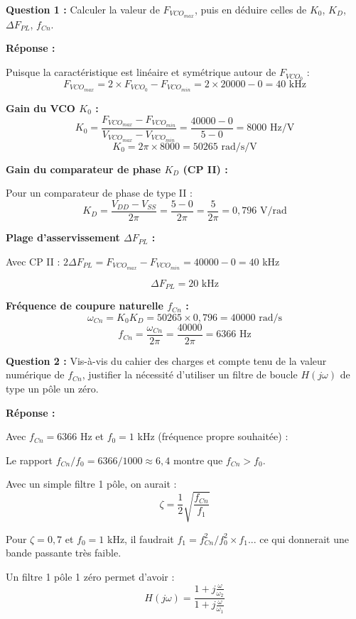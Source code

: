\documentclass[a4paper,11pt]{article}
\begin{document}
\textbf{Question 1 :} Calculer la valeur de $F_{VCO_{max}}$, puis en déduire celles de $K_0$, $K_D$, $\Delta F_{PL}$, $f_{Cn}$.

\vspace{0.3cm}
\textbf{Réponse :}

Puisque la caractéristique est linéaire et symétrique autour de $F_{VCO_0}$ :
\[
F_{VCO_{max}} = 2 \times F_{VCO_0} - F_{VCO_{min}} = 2 \times 20000 - 0 = \boxed{40 \text{ kHz}}
\]

\textbf{Gain du VCO $K_0$ :}
\[
K_0 = \frac{F_{VCO_{max}} - F_{VCO_{min}}}{V_{VCO_{max}} - V_{VCO_{min}}} = \frac{40000 - 0}{5 - 0} = 8000 \text{ Hz/V}
\]
\[
K_0 = 2\pi \times 8000 = \boxed{50265 \text{ rad/s/V}}
\]

\textbf{Gain du comparateur de phase $K_D$ (CP II) :}

Pour un comparateur de phase de type II :
\[
K_D = \frac{V_{DD} - V_{SS}}{2\pi} = \frac{5 - 0}{2\pi} = \frac{5}{2\pi} = \boxed{0{,}796 \text{ V/rad}}
\]

\textbf{Plage d'asservissement $\Delta F_{PL}$ :}

Avec CP II : $2\Delta F_{PL} = F_{VCO_{max}} - F_{VCO_{min}} = 40000 - 0 = 40$ kHz

\[
\boxed{\Delta F_{PL} = 20 \text{ kHz}}
\]

\textbf{Fréquence de coupure naturelle $f_{Cn}$ :}
\[
\omega_{Cn} = K_0 K_D = 50265 \times 0{,}796 = 40000 \text{ rad/s}
\]
\[
f_{Cn} = \frac{\omega_{Cn}}{2\pi} = \frac{40000}{2\pi} = \boxed{6366 \text{ Hz}}
\]

\vspace{0.5cm}
\textbf{Question 2 :} Vis-à-vis du cahier des charges et compte tenu de la valeur numérique de $f_{Cn}$, justifier la nécessité d'utiliser un filtre de boucle $H(j\omega)$ de type un pôle un zéro.

\vspace{0.3cm}
\textbf{Réponse :}

Avec $f_{Cn} = 6366$ Hz et $f_0 = 1$ kHz (fréquence propre souhaitée) :

Le rapport $f_{Cn}/f_0 = 6366/1000 \approx 6{,}4$ montre que $f_{Cn} > f_0$.

Avec un simple filtre 1 pôle, on aurait :
\[
\zeta = \frac{1}{2}\sqrt{\frac{f_{Cn}}{f_1}}
\]

Pour $\zeta = 0{,}7$ et $f_0 = 1$ kHz, il faudrait $f_1 = f_{Cn}^2/f_0^2 \times f_1$... ce qui donnerait une bande passante très faible.

Un filtre 1 pôle 1 zéro permet d'avoir :
\[
H(j\omega) = \frac{1 + j\frac{\omega}{\omega_2}}{1 + j\frac{\omega}{\omega_1}}
\]
\end{document}
